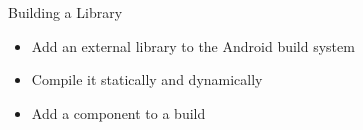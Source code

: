 \setuplabframe
{Building a Library}
{
  \begin{itemize}
  \item Add an external library to the Android build system
  \item Compile it statically and dynamically
  \item Add a component to a build
  \end{itemize}
}
